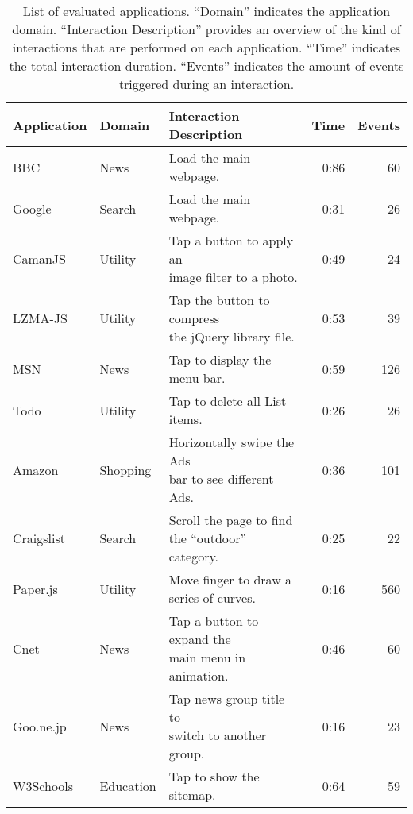 
\begin{table}[p]
\large
\centering
\captionsetup{width=\columnwidth}
\caption{List of evaluated applications. ``Domain'' indicates the application domain. ``Interaction Description'' provides an overview of the kind of interactions that are performed on each application. ``Time'' indicates the total interaction duration. ``Events'' indicates the amount of events triggered during an interaction.}
\renewcommand*{\arraystretch}{1.5}
\renewcommand*{\tabcolsep}{5pt}
\resizebox{\columnwidth}{!}
{  
\begin{tabular}{l l l r r}
\toprule[0.15em]
\bigstrut\textbf{Application}  &  \bigstrut\textbf{Domain} &  \bigstrut\textbf{Interaction Description} & \bigstrut\textbf{Time}  & \bigstrut\textbf{Events} \\
\midrule[0.05em]
BBC          & News   & Load the main webpage. & 0:86    & 60 \\ \cline{3-3}
Google       & Search    & Load the main webpage. & 0:31    & 26\\\cline{3-3}
CamanJS      & Utility   & \specialcell{Tap a button to apply an\\ image filter to a photo.} & 0:49    & 24\\\cline{3-3}
LZMA-JS      & Utility & \specialcell{Tap the button to compress\\ the jQuery library file.}    & 0:53    & 39 \\\cline{3-3}
MSN          & News   & Tap to display the menu bar. & 0:59    & 126 \\\cline{3-3}
Todo         & Utility   & Tap to delete all List items. & 0:26    & 26\\\cline{3-3}
Amazon       & Shopping & \specialcell{Horizontally swipe the Ads\\ bar to see different Ads.}     & 0:36    & 101\\\cline{3-3}
Craigslist   & Search     & \specialcell{Scroll the page to find\\the ``outdoor'' category.} & 0:25    & 22\\\cline{3-3}
Paper.js     & Utility    & \specialcell{Move finger to draw a \\series of curves.} &  0:16    & 560 \\\cline{3-3}
Cnet         & News   & \specialcell{Tap a button to expand the \\main menu in animation.} & 0:46    & 60 \\\cline{3-3}
Goo.ne.jp          & News   & \specialcell{Tap news group title to\\ switch to another group.} & 0:16    & 23 \\\cline{3-3}
W3Schools    & Education   & Tap to show the sitemap. &  0:64    & 59 \\
\bottomrule[0.15em]
\end{tabular}
}
\label{tab:app_ebs}
\end{table}

